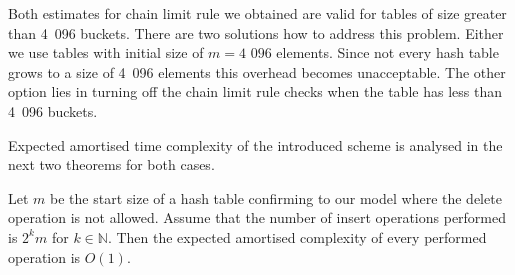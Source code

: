 Both estimates for chain limit rule we obtained are valid for tables of size greater than 4~096 buckets. There are two solutions how to address this problem. Either we use tables with initial size of $m = \text{4~096}$ elements. Since not every hash table grows to a size of 4~096 elements this overhead becomes unacceptable. The other option lies in turning off the chain limit rule checks when the table has less than 4~096 buckets. 

Expected amortised time complexity of the introduced scheme is analysed in the next two theorems for both cases.

\begin{theorem}
Let $m$ be the start size of a hash table confirming to our model where the delete operation is not allowed. Assume that the number of insert operations performed is $2^k m$ for $k \in \mathbb{N}$. Then the expected amortised complexity of every performed operation is $O(1)$.
\end{theorem}
